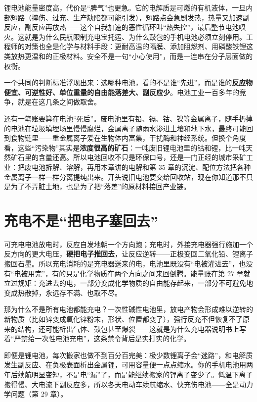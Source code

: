 锂电池能量密度高，代价是“脾气”也更急。它的电解质是可燃的有机液体，一旦内部短路（摔伤、过充、生产缺陷都可能引发），短路点会急剧发热，热量又加速副反应，副反应再放热——这个自我加速的恶性循环叫“热失控”，最后整节电池喷火。这就是为什么民航限制充电宝托运、为什么鼓包的手机电池必须立刻停用。工程师的对策也全是化学与材料手段：更耐高温的隔膜、添加阻燃剂、用磷酸铁锂这类放热更温和的正极材料。安全不是一句“小心使用”，而是一连串在分子层面做的权衡。

一个共同的判断标准浮现出来：选哪种电池，看的不是谁“先进”，而是谁的\textbf{反应物便宜、可逆性好、单位重量的自由能落差大、副反应少}。电池工业一百多年的竞争，就是在这几条之间做取舍。

还有一笔账要算在电池“死后”。废电池里有铅、镉、钴、镍等金属离子，随手扔掉的电池在垃圾填埋场里慢慢腐烂，金属离子随雨水渗进土壤和地下水，最终可能回到食物链里——重金属离子爱在生物体内富集，干扰酶和神经系统。但换个角度看，这些“污染物”其实是\textbf{浓度很高的矿石}：一吨废旧锂电池里的钴和锂，比一吨天然矿石里的含量还高。所以电池回收不只是环保口号，还是一门正经的城市采矿工业：把废电池拆解、溶解，再用本章讲的电解和第 35 章的沉淀、配位方法把各种金属离子一样一样分离提纯出来。开头说旧电池要交给回收站，现在你知道那不只是为了不弄脏土地，也是为了把“落差”的原材料接回产业链。

\section{充电不是“把电子塞回去”}

可充电电池放电时，反应自发地朝一个方向跑；充电时，外接充电器强行施加一个反方向的更大电压，\textbf{硬把电子推回去}，让反应逆转——正极变回二氧化铅、锂离子搬回石墨。所以充电消耗的是充电器送来的电，电池里既没有“电被灌进去”，也没有“电被用完”，有的只是化学物质在两个方向之间来回倒腾。能量账在第 27 章就立过规矩：充进去的电，一部分变成化学物质的自由能存起来，一部分不可避免地变成热散掉，永远存不满、也取不尽。

那为什么不是所有电池都能充电？一次性碱性电池里，放电产物会形成难以逆转的新物质（比如锌变成氧化锌粉末，形状、位置都变了），强行反充不但恢复不了原来的结构，还可能析出气体、鼓包甚至爆裂——这就是为什么充电器说明书上写着“严禁给一次性电池充电”，这条禁令背后是实打实的化学。

即便是锂电池，每次搬家也做不到百分百完美：极少数锂离子会“迷路”，和电解质发生副反应、在负极表面析出金属锂，可用容量便一点点缩水。你的手机电池用两年后续航明显变短，不是电“漏”了，而是能继续搬家的锂离子变少了。低温下离子搬得慢、大电流下副反应多，所以冬天电动车续航缩水、快充伤电池——全是动力学问题（第 29 章）。

